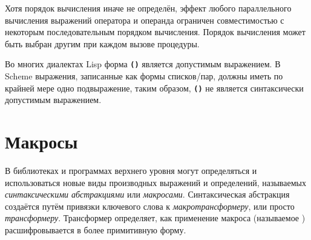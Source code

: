 \begin{entry}{%
}
\begin{note}
Хотя порядок вычисления иначе не определён, эффект любого параллельного вычисления выражений
оператора и операнда ограничен совместимостью с некоторым последовательным порядком
вычисления. Порядок вычисления может быть выбран другим при каждом вызове процедуры.
\end{note}


\begin{note} %
Во многих диалектах Lisp форма {\tt\textbf{()}} является допустимым выражением. В Scheme
выражения, записанные как формы списков/пар, должны иметь по крайней мере одно подвыражение, таким
образом, {\tt\textbf{()}} не является синтаксически допустимым выражением.
\end{note}

\end{entry}

\section{Макросы}\vspace{1mm}
\label{macrosection}

В библиотеках и программах верхнего уровня могут определяться и использоваться новые виды
производных выражений и определений, называемых {\em синтаксическими абстракциями} или {\em
  макросами}.  Синтаксическая абстракция
создаётся путём привязки ключевого слова к {\em макротрансформеру}, или просто {\em
  трансформеру}. Трансформер
определяет, как применение макроса (называемое ) расшифровывается в
более примитивную форму.\vspace{1mm}

